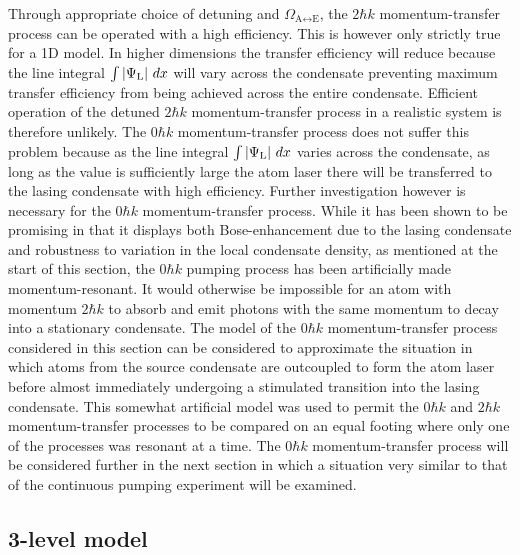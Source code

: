 Through appropriate choice of detuning and $\Omega_{\text{A} \leftrightarrow \text{E}}$, the $2 \hbar k$ momentum-transfer process can be operated with a high efficiency.  This is however only strictly true for a 1D model.  In higher dimensions the transfer efficiency will reduce because the line integral $\int \left|\Psi_\text{L}\right|\, dx$ will vary across the condensate preventing maximum transfer efficiency from being achieved across the entire condensate.  Efficient operation of the detuned $2 \hbar k$ momentum-transfer process in a realistic system is therefore unlikely.  The $0 \hbar k$ momentum-transfer process does not suffer this problem because as the line integral $\int \left|\Psi_\text{L}\right|\, dx$ varies across the condensate, as long as the value is sufficiently large the atom laser there will be transferred to the lasing condensate with high efficiency.  Further investigation however is necessary for the $0 \hbar k$ momentum-transfer process.  While it has been shown to be promising in that it displays both Bose-enhancement due to the lasing condensate and robustness to variation in the local condensate density, as mentioned at the start of this section, the $0 \hbar k$ pumping process has been artificially made momentum-resonant.  It would otherwise be impossible for an atom with momentum $2 \hbar k$ to absorb and emit photons with the same momentum to decay into a stationary condensate.  The model of the $0 \hbar k$ momentum-transfer process considered in this section can be considered to approximate the situation in which atoms from the source condensate are outcoupled to form the atom laser before almost immediately undergoing a stimulated transition into the lasing condensate.  This somewhat artificial model was used to permit the $0 \hbar k$ and $2\hbar k$ momentum-transfer processes to be compared on an equal footing where only one of the processes was resonant at a time.  The $0 \hbar k$ momentum-transfer process will be considered further in the next section in which a situation very similar to that of the continuous pumping experiment will be examined.

\subsection{3-level model}

